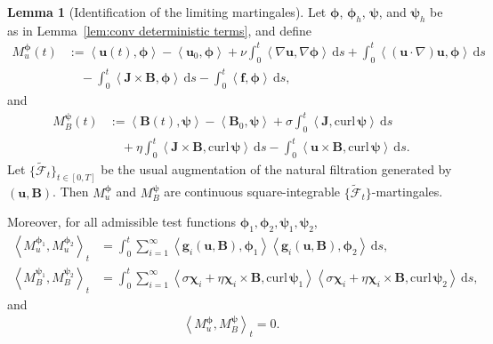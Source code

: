 \documentclass[11pt, reqno]{amsart}
\theoremstyle{definition}
\newtheorem{lemma}[theorem]{Lemma}
\numberwithin{equation}{section}
\newcommand{\curl}{\mathrm{curl}\,}
\newcommand{\bff}{\boldsymbol}
\newcommand{\ds}{\,\mathrm{d}s}
\newcommand{\inpro}[2]{\left\langle#1,#2\right\rangle}
\begin{document}
\begin{lemma}[Identification of the limiting martingales]
	\label{lem:conv martingale identification}
	Let $\bff\phi$, $\bff\phi_h$, $\bff\psi$, and $\bff\psi_h$ be as in
	Lemma~\ref{lem:conv deterministic terms}, and define
	\begin{align}
		\label{equ:lim mart u theorem}
		M_u^{\bff\phi}(t)
		&:=
		\inpro{\bff u(t)}{\bff\phi}
		-
		\inpro{\bff u_0}{\bff\phi}
		+
		\nu\int_0^t
		\inpro{\nabla\bff u}{\nabla\bff\phi}\ds
		+
		\int_0^t
		\inpro{(\bff u\cdot\nabla)\bff u}{\bff\phi}\ds
		\nonumber\\
		&\quad
		-
		\int_0^t
		\inpro{\bff J\times\bff B}{\bff\phi}\ds
		-
		\int_0^t
		\inpro{\bff f}{\bff\phi}\ds,
	\end{align}
	and
	\begin{align}
		\label{equ:lim mart B theorem}
		M_B^{\bff\psi}(t)
		&:=
		\inpro{\bff B(t)}{\bff\psi}
		-
		\inpro{\bff B_0}{\bff\psi}
		+
		\sigma\int_0^t
		\inpro{\bff J}{\curl\bff\psi}\ds
		\nonumber\\
		&\quad
		+
		\eta\int_0^t
		\inpro{\bff J\times\bff B}{\curl\bff\psi}\ds
		-
		\int_0^t
		\inpro{\bff u\times\bff B}{\curl\bff\psi}\ds .
	\end{align}
	Let $\{\widetilde{\mathscr F}_t\}_{t\in[0,T]}$ be the usual augmentation
	of the natural filtration generated by $(\bff u,\bff B)$. Then
	$M_u^{\bff\phi}$ and $M_B^{\bff\psi}$ are continuous square-integrable
	$\{\widetilde{\mathscr F}_t\}$-martingales.
	
	Moreover, for all admissible test functions
	$\bff\phi_1,\bff\phi_2,\bff\psi_1,\bff\psi_2$,
	\begin{align}
		\label{equ:lim qv u}
		\left\langle
		M_u^{\bff\phi_1},
		M_u^{\bff\phi_2}
		\right\rangle_t
		&=
		\int_0^t
		\sum_{i=1}^{\infty}
		\inpro{\bff g_i(\bff u,\bff B)}{\bff\phi_1}
		\inpro{\bff g_i(\bff u,\bff B)}{\bff\phi_2}
		\ds,
		\\
		\label{equ:lim qv B}
		\left\langle
		M_B^{\bff\psi_1},
		M_B^{\bff\psi_2}
		\right\rangle_t
		&=
		\int_0^t
		\sum_{i=1}^{\infty}
		\inpro{
			\sigma\bff\chi_i+\eta\bff\chi_i\times\bff B}
		{\curl\bff\psi_1}
		\inpro{
			\sigma\bff\chi_i+\eta\bff\chi_i\times\bff B}
		{\curl\bff\psi_2}
		\ds,
	\end{align}
	and
	\begin{align}
		\label{equ:lim cross qv zero}
		\left\langle
		M_u^{\bff\phi},
		M_B^{\bff\psi}
		\right\rangle_t
		=0.
	\end{align}
\end{lemma}
\end{document}
